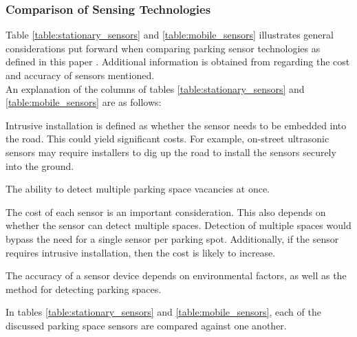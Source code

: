 \subsubsection*{Comparison of Sensing Technologies}
Table \ref{table:stationary_sensors} and \ref{table:mobile_sensors} illustrates general considerations put forward when comparing parking sensor technologies as defined in this paper \citep{Lin2008SecurityNetworks}. Additional information is obtained from \citep{dokur_embedded_2016} regarding the cost and accuracy of sensors mentioned. \\

\noindent An explanation of the columns of tables \ref{table:stationary_sensors} and \ref{table:mobile_sensors} are as follows:
\begin{description}[leftmargin=14em, style=nextline]
    \item[Intrusive Installation (IV)] Intrusive installation is defined as whether the sensor needs to be embedded into the road. This could yield significant costs. For example, on-street ultrasonic sensors may require installers to dig up the road to install the sensors securely into the ground.
    \item[Multiple Detection (MD)] The ability to detect multiple parking space vacancies at once.
    \item[Cost (C)] The cost of each sensor is an important consideration. This also depends on whether the sensor can detect multiple spaces. Detection of multiple spaces would bypass the need for a single sensor per parking spot. Additionally, if the sensor requires intrusive installation, then the cost is likely to increase.
    \item[Accuracy (A)] The accuracy of a sensor device depends on environmental factors, as well as the method for detecting parking spaces.
\end{description}

In tables \ref{table:stationary_sensors} and \ref{table:mobile_sensors}, each of the discussed parking space sensors are compared against one another. 

